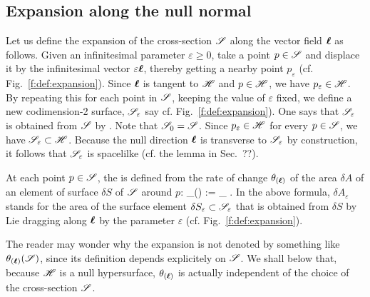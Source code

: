 \subsection{Expansion along the null normal}

Let us define the expansion of the cross-section $\mathscr{S}$ along the vector
field $\bm{\ell}$ as follows. Given an infinitesimal parameter $\varepsilon\geq 0$, take a point
$p\in \mathscr{S}$ and displace it by the infinitesimal vector $\varepsilon \bm{\ell}$, thereby getting
a nearby point $p_\varepsilon$ (cf. Fig.~\ref{f:def:expansion}).
Since $\bm{\ell}$ is tangent to $\mathscr{H}$ and $p\in\mathscr{H}$, we have $p_\varepsilon\in\mathscr{H}$.
By repeating this for each point in $\mathscr{S}$,
keeping the value of $\varepsilon$ fixed, we define a new codimension-2 surface,
$\mathscr{S}_\varepsilon$ say cf. Fig.~\ref{f:def:expansion}). One says that $\mathscr{S}_\varepsilon$ is obtained
from $\mathscr{S}$ by .
Note that $\mathscr{S}_0 = \mathscr{S}$.
Since $p_\varepsilon\in\mathscr{H}$ for every $p\in\mathscr{S}$, we have $\mathscr{S}_\varepsilon\subset \mathscr{H}$.
Because the null direction $\bm{\ell}$ is transverse to $\mathscr{S}_\varepsilon$ by construction, it
follows that $\mathscr{S}_\varepsilon$ is spacelilke (cf. the lemma in Sec.~??).

At each point $p\in\mathscr{S}$, the  is defined from the
rate of change $\theta_{(\bm{\ell})}$ of the area $\delta A$ of an element of surface $\delta S$ of
$\mathscr{S}$ around $p$:
\be \label{e:def:def_expansion}
    \theta_{(\wl)} := \lim_{\varepsilon{}} 
     .
\ee
In the above formula, $\delta A_\varepsilon$ stands for the area of the
surface element $\delta S_\varepsilon\subset \mathscr{S}_\varepsilon$ that is obtained from $\delta S$ by
Lie dragging along $\bm{\ell}$ by the parameter $\varepsilon$ (cf. Fig.~\ref{f:def:expansion}).
\begin{remark} \label{r:def:expansion_indpt_S}
The reader may wonder why the expansion is not denoted by something like
$\theta_{(\bm{\ell})}(\mathscr{S})$, since its definition depends explicitely on
$\mathscr{S}$. We shall below that, because $\mathscr{H}$ is a null hypersurface, $\theta_{(\bm{\ell})}$
is actually independent of the choice of the cross-section $\mathscr{S}$.
\end{remark}


